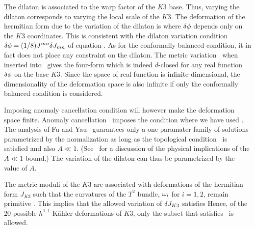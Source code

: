 The dilaton is associated to the warp factor of the $K3$ base.
Thus, varying the dilaton corresponds to varying the local scale
of the $K3$. The deformation of the hermitian form due to the
variation of the dilaton is \eqn{} where $\delta \phi$ depends only on the $K3$ coordinates. This
is consistent with the dilaton variation condition $\delta \phi =
(1/8) J^{mn} \delta J_{mn}$ of equation \dilvar.  As for the
conformally balanced condition, it in fact does not place any
constraint on the dilaton. The metric variation \dilv\ when
inserted into \ttcb\ gives the four-form \eqn{} which is indeed $d$-closed for
any real function $\delta \phi$ on the base $K3$. Since the space of
real function is infinite-dimensional, the dimensionality of the
deformation space is also infinite if only the conformally
balanced condition is considered.

Imposing anomaly cancellation condition will however make the
deformation space finite.  Anomaly cancellation \anomtt\ imposes
the condition \eqn{} where we
have used \traa. The analysis of Fu and Yau \FY\ guarantees only a
one-paramater family of solutions parametrized by the
normalization \eqn{} as long as the topological condition
\kfcon\ is satisfied and also $A\ll 1$.  (See \BBFTY\ for a discussion of the physical implications of the $A \ll 1$ bound.)
The variation of the
dilaton can thus be parametrized by the value of
$A$.




The metric moduli of the $K3$ are associated with deformations of
the hermitian form $J_{K3}$ such that the curvatures of the $T^2$
bundle, $\omega_i$ for $i=1,2$, remain primitive \omprim. This
implies that the allowed variation of $\delta J_{K3}$ satisfies
\eqn{} Hence, of the $20$ possible $h^{1,1}$
K\"ahler deformations of $K3$, only the subset that satisfies
\curvar\ is allowed.


